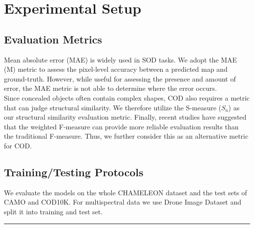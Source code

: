 \vspace{1cm}
\section{{{\fontsize{17}{21}\selectfont \textbf{Experimental Setup}}}}
\setlength{\columnsep}{1.5cm}

\begin{multicols}{2}
\vspace{0.5cm}
\subsection{{{\fontsize{14}{19}\selectfont \textbf{Evaluation Metrics}}}}
Mean absolute error (MAE) is widely used in SOD tasks. We adopt the MAE (M) metric to assess the pixel-level accuracy between a predicted map and ground-truth. However, while useful for assessing the presence and amount of error, the MAE metric is not able to determine where the error occurs.\\
Since concealed objects often contain complex shapes, COD also requires a metric that can judge structural similarity. We therefore utilize the S-measure (\(S_a\)) as our structural similarity evaluation metric. Finally, recent studies have
suggested that the weighted F-measure can provide more reliable evaluation results than the traditional F-measure. Thus, we further consider this as an alternative metric for COD.
\vspace{0.5cm}
\subsection{{{\fontsize{14}{19}\selectfont \textbf{Training/Testing Protocols}}}}
We evaluate the models on the whole CHAMELEON\cite{camo_dataset} dataset and the test sets of CAMO and COD10K. For multispectral data we use Drone Image Dataset and split it into training and test set.

\end{multicols}

\vspace{0.5cm}
{\color{gray}\hrule}
\vspace{0.5cm}